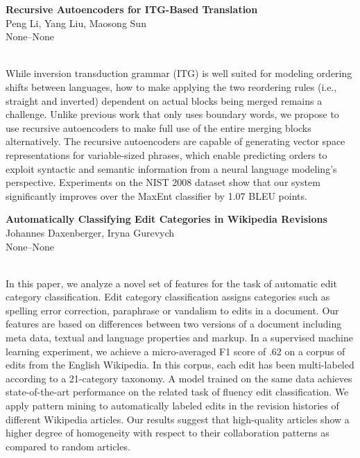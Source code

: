 \documentclass[twoside,makeidx]{book}
\begin{document}
\par\vspace{2em}\noindent%
\begin{minipage}{\linewidth}%
\begin{center}
\textbf{\normalsize Recursive Autoencoders for ITG-Based Translation}\\
\normalsize  Peng Li,  Yang Liu,  Maosong Sun\\
{\small None--None}\\
\end{center}
\end{minipage}\\[0.5em]
\nopagebreak%
\noindent%
{\small While inversion transduction grammar (ITG) is well suited for modeling ordering shifts between languages, how to make applying the two reordering rules (i.e., straight and inverted) dependent on actual blocks being merged remains a challenge. Unlike previous work that only uses boundary words, we propose to use recursive autoencoders to make full use of the entire merging blocks alternatively. The recursive autoencoders are capable of generating vector space representations for variable-sized phrases, which enable predicting orders to exploit syntactic and semantic information from a neural language modeling's perspective. Experiments on the NIST 2008 dataset show that our system significantly improves over the MaxEnt classifier by 1.07 BLEU points.}
\par\vspace{2em}\noindent%
\begin{minipage}{\linewidth}%
\begin{center}
\textbf{\normalsize Automatically Classifying Edit Categories in Wikipedia Revisions}\\
\normalsize  Johannes Daxenberger,  Iryna Gurevych\\
{\small None--None}\\
\end{center}
\end{minipage}\\[0.5em]
\nopagebreak%
\noindent%
{\small In this paper, we analyze a novel set of features for the task of automatic edit category classification. Edit category classification assigns categories such as spelling error correction, paraphrase or vandalism to edits in a document. Our features are based on differences between two versions of a document including meta data, textual and language properties and markup. In a supervised machine learning experiment, we achieve a micro-averaged F1 score of .62 on a corpus of edits from the English Wikipedia. In this corpus, each edit has been multi-labeled according to a 21-category taxonomy. A model trained on the same data achieves state-of-the-art performance on the related task of fluency edit  classification. We apply pattern mining to automatically labeled edits in the revision histories of different Wikipedia articles. Our results suggest that high-quality articles show a higher degree of homogeneity with respect to their collaboration patterns as compared to random  articles.}
\end{document}
